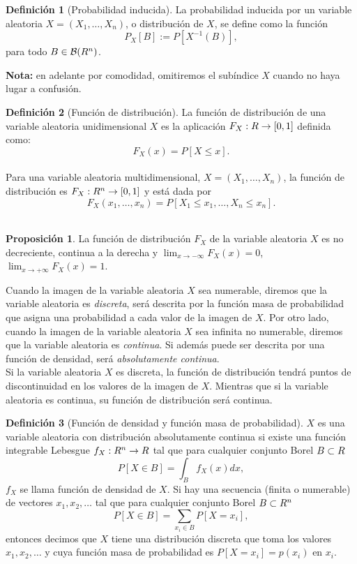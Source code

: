 \documentclass[12pt,a4paper]{report} %
\let\mathbb\relax
\theoremstyle{definition}
\newtheorem{definition}{Definición}[section]
\newtheorem{proposition}[theorem]{Proposición}
\begin{document}
\begin{definition}[Probabilidad inducida]
  La probabilidad inducida por un variable aleatoria $X=(X_1,\dots, X_n)$, o distribución de $X$, se define como la función \[
P_X[B]:= P[X^{-1}(B)],
  \]
para todo $B \in \mathcal{B}(\mathbb{R}^n)$.\\
\end{definition}

\textbf{Nota:} en adelante por comodidad, omitiremos el subíndice $X$ cuando no haya lugar a confusión.\\

\begin{definition}[Función de distribución]
  La función de distribución de una variable aleatoria unidimensional $X$ es la aplicación $F_X:\mathbb{R}\to[0,1]$ definida como:\[
F_X(x) = P[X\leq x].
  \]\\[-5pt]
Para una variable aleatoria multidimensional,  $X=(X_1,\dots,X_n)$, la función de distribución es $F_X:\mathbb{R}^n\to[0,1]$ y está dada por\[
F_X(x_1,\dots,x_n) = P[X_1\leq x_1,\dots, X_n\leq x_n].
  \]\\[-10pt]
\end{definition}

\begin{proposition}
  La función de distribución $F_X$ de la variable aleatoria $X$ es no decreciente, continua a la derecha y $\lim_{x\to - \infty}F_X(x) = 0$, $\lim_{x\to +\infty}F_X(x) = 1$.\\
\end{proposition}

Cuando la imagen de la variable aleatoria $X$ sea numerable, diremos que la variable aleatoria es \textit{discreta}, será descrita por la función masa de probabilidad que asigna una probabilidad a cada valor de la imagen de $X$. Por otro lado, cuando la imagen de la variable aleatoria $X$ sea infinita no numerable, diremos que la variable aleatoria es \textit{continua}. Si además puede ser descrita por una función de densidad, será \textit{absolutamente continua}.\\
  
  Si la variable aleatoria $X$ es discreta, la función de distribución tendrá puntos de discontinuidad en los valores de la imagen de $X$. Mientras que si la variable aleatoria es continua, su función de distribución será continua.\\

  \begin{definition}[Función de densidad y función masa de probabilidad]
 $X$ es una variable aleatoria con distribución absolutamente continua si existe una función integrable Lebesgue $f_X:\mathbb{R}^n\to \mathbb{R}$ tal que para cualquier conjunto Borel $B\subset \mathbb{R}$\[
P[X\in B] = \int_B f_X(x) dx,
\]
$f_X$ se llama función de densidad de $X$. Si hay una secuencia (finita o numerable) de vectores $x_1,x_2,\dots$ tal que para cualquier conjunto Borel $B\subset \mathbb{R}^n$\[
P[X\in B] = \sum_{x_i\in B}P[X = x_i],
\]
entonces decimos que $X$ tiene una distribución discreta que toma los valores $x_1,x_2,\dots$ y cuya función masa de probabilidad es $P[X=x_i]=p(x_i)$ en $x_i$.\\
\end{definition}
\end{document}
